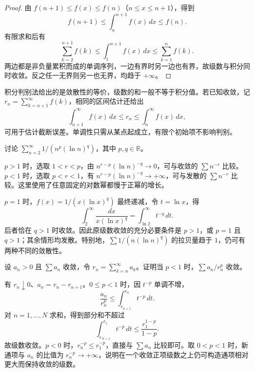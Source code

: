 \begin{proof}
由 $f(n+1)\leq f(x)\leq f(n)$（$n\leq x\leq n+1$），得到
\[
    f(n+1)\leq\int_n^{n+1}f(x)\,dx\leq f(n).
\]
有限求和后有
\begin{equation}
    \sum_{k=2}^{n+1}f(k)
    \leq\int_1^{n+1}f(x)\,dx
    \leq\sum_{k=1}^n f(k).
    \label{eq:series-integral-comparison}
\end{equation}
两边都是非负量累积而成的单调序列，一边有界时另一边也有界，故级数与积分同时收敛。反之任一无界则另一也无界，均趋于 $+\infty$。
\end{proof}

积分判别法给出的是敛散性的等价，级数的和一般不等于积分值。若已知收敛，记 $r_n=\sum_{k=n+1}^{\infty}f(k)$，相同的区间估计还给出
\begin{equation}
    \int_{n+1}^{\infty}f(x)\,dx\leq r_n
       \leq\int_n^{\infty}f(x)\,dx,
    \label{eq:integral-test-series-tail-bound}
\end{equation}
可用于估计截断误差。单调性只需从某点起成立，有限个初始项不影响判别。

\begin{example}
\label{ex:logarithmic-p-series}
讨论 $\sum_{n=2}^{\infty}1/(n^p(\ln n)^q)$，其中 $p,q\in\mathbb R$。
\end{example}

\begin{solve}
$p>1$ 时，选取 $1<r<p$，由 $n^{r-p}(\ln n)^{-q}\to0$，可与收敛的 $\sum n^{-r}$ 比较。$p<1$ 时，选取 $p<r<1$，有 $n^{r-p}(\ln n)^{-q}\to+\infty$，可与发散的 $\sum n^{-r}$ 比较。这里使用了任意固定的对数幂都慢于正幂的增长。

$p=1$ 时，$f(x)=1/(x(\ln x)^q)$ 最终递减，令 $t=\ln x$，得
\[
    \int_2^{\infty}\frac{dx}{x(\ln x)^q}
      =\int_{\ln2}^{\infty}t^{-q}\,dt.
\]
后者恰在 $q>1$ 时收敛。因此原级数收敛的充分必要条件是 $p>1$，或 $p=1$ 且 $q>1$；其余情形均发散。特别地，$\sum1/(n(\ln n)^q)$ 的拉贝量趋于 $1$，仍可有两种不同的敛散性。
\end{solve}

\begin{example}
\label{ex:positive-series-tail-powered-denominator}
设 $a_n>0$ 且 $\sum a_n$ 收敛，令 $r_n=\sum_{k=n}^{\infty}a_k$。证明当 $p<1$ 时，$\sum a_n/r_n^p$ 收敛。
\end{example}

\begin{solve}
有 $r_n\downarrow0$、$a_n=r_n-r_{n+1}$。$0\leq p<1$ 时，因 $t^{-p}$ 单调不增，
\[
    \frac{a_n}{r_n^p}
      \leq\int_{r_{n+1}}^{r_n}t^{-p}\,dt.
\]
对 $n=1,\ldots,N$ 求和，得到部分和不超过
\[
    \int_{r_{N+1}}^{r_1}t^{-p}\,dt
      \leq\frac{r_1^{1-p}}{1-p}.
\]
故级数收敛。$p<0$ 时，$r_n^{-p}\leq r_1^{-p}$，直接与 $\sum a_n$ 比较即可。取 $0<p<1$ 时，新通项与 $a_n$ 的比值为 $r_n^{-p}\to+\infty$，说明在一个收敛正项级数之上仍可构造通项相对更大而保持收敛的级数。
\end{solve}

